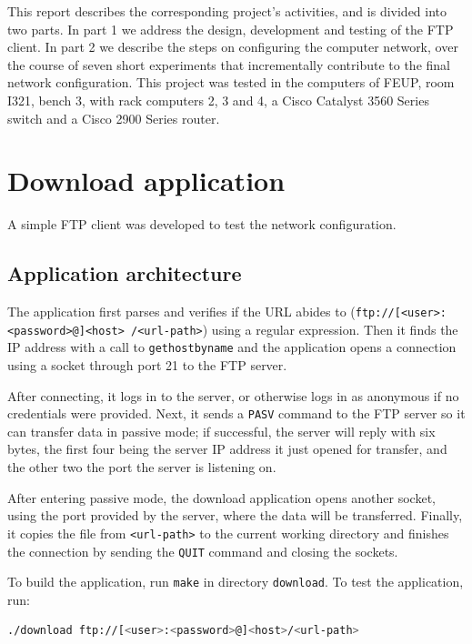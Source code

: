 \documentclass[a4paper, 11pt]{report}
\begin{document}
This report describes the corresponding project's activities, and is divided into two parts.
In part 1 we address the design, development and testing of the FTP client.
In part 2 we describe the steps on configuring the computer network, over the course of seven short experiments that incrementally contribute to the final network configuration.
This project was tested in the computers of FEUP, room I321, bench 3, with rack computers 2, 3 and 4, a Cisco Catalyst 3560 Series switch and a Cisco 2900 Series router.

\section{Download application} \label{sec:Part1}

A simple FTP client was developed to test the network configuration.

\subsection{Application architecture} \label{sec:Arc}

The application first parses and verifies if the URL abides to \cite{rfc1738} (\texttt{ftp://[<user>:<password>@]<host> /<url-path>}) using a regular expression.
Then it finds the IP address with a call to \texttt{gethostbyname} and the application opens a connection using a socket through port 21 to the FTP server. 

After connecting, it logs in to the server, or otherwise logs in as anonymous if no credentials were provided.
Next, it sends a \texttt{PASV} command to the FTP server so it can transfer data in passive mode; if successful, the server will reply
with six bytes, the first four being the server IP address it just opened for transfer, and the other two the port the server is listening on. 

After entering passive mode, the download application opens another socket, using the port provided by the server, where the data will be transferred.
Finally, it copies the file from \texttt{<url-path>} to the current working directory and finishes the connection by sending the \texttt{QUIT} command and closing the sockets.

To build the application, run \texttt{make} in directory \texttt{download}. To test the application, run:

\begin{lstlisting}[frame=none, numbers=none, language=sh]
./download ftp://[<user>:<password>@]<host>/<url-path>
\end{lstlisting}
\end{document}
